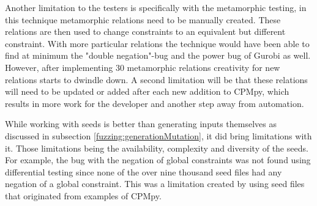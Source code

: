Another limitation to the testers is specifically with the metamorphic testing, in this technique metamorphic relations need to be manually created. These relations are then used to change constraints to an equivalent but different constraint. With more particular relations the technique would have been able to find at minimum the "double negation"-bug and the power bug of Gurobi as well. However, after implementing 30 metamorphic relations creativity for new relations starts to dwindle down. A second limitation will be that these relations will need to be updated or added after each new addition to CPMpy, which results in more work for the developer and another step away from automation.


While working with seeds is better than generating inputs themselves as discussed in subsection \ref{fuzzing:generationMutation}, it did bring limitations with it. Those limitations being the availability, complexity and diversity of the seeds. For example, the bug with the negation of global constraints was not found using differential testing since none of the over nine thousand seed files had any negation of a global constraint. This was a limitation created by using seed files that originated from examples of CPMpy.




